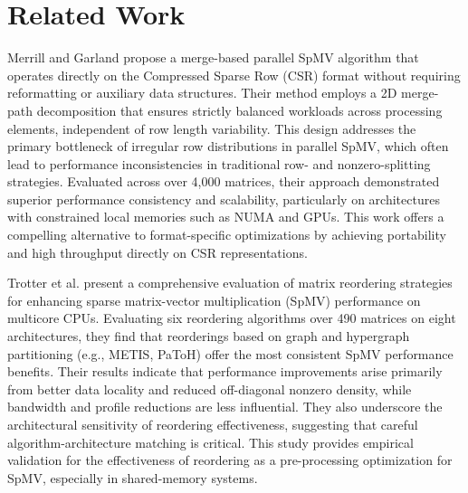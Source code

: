 \chapter{Related Work}
Merrill and Garland \cite{merrilduane} propose a merge-based parallel SpMV algorithm that operates directly on the Compressed Sparse Row (CSR) format without requiring reformatting or auxiliary data structures. Their method employs a 2D merge-path decomposition that ensures strictly balanced workloads across processing elements, independent of row length variability. This design addresses the primary bottleneck of irregular row distributions in parallel SpMV, which often lead to performance inconsistencies in traditional row- and nonzero-splitting strategies. Evaluated across over 4,000 matrices, their approach demonstrated superior performance consistency and scalability, particularly on architectures with constrained local memories such as NUMA and GPUs. This work offers a compelling alternative to format-specific optimizations by achieving portability and high throughput directly on CSR representations.
\medskip

Trotter et al. \cite{ordersparse} present a comprehensive evaluation of matrix reordering strategies for enhancing sparse matrix-vector multiplication (SpMV) performance on multicore CPUs. Evaluating six reordering algorithms over 490 matrices on eight architectures, they find that reorderings based on graph and hypergraph partitioning (e.g., METIS, PaToH) offer the most consistent SpMV performance benefits. Their results indicate that performance improvements arise primarily from better data locality and reduced off-diagonal nonzero density, while bandwidth and profile reductions are less influential. They also underscore the architectural sensitivity of reordering effectiveness, suggesting that careful algorithm-architecture matching is critical. This study provides empirical validation for the effectiveness of reordering as a pre-processing optimization for SpMV, especially in shared-memory systems.

